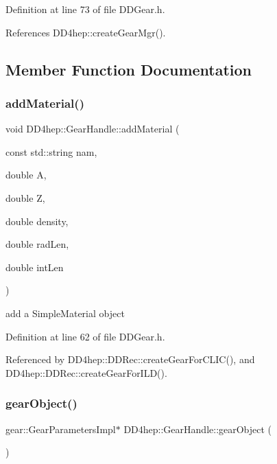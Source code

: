 Definition at line 73 of file D\+D\+Gear.\+h.



References D\+D4hep\+::create\+Gear\+Mgr().



\subsection{Member Function Documentation}
\hypertarget{class_d_d4hep_1_1_gear_handle_ae5f3ea169e473f5f0bd46f8d27d5d170}{}\label{class_d_d4hep_1_1_gear_handle_ae5f3ea169e473f5f0bd46f8d27d5d170} 
\subsubsection{\texorpdfstring{add\+Material()}{addMaterial()}}
{\footnotesize\ttfamily void D\+D4hep\+::\+Gear\+Handle\+::add\+Material (\begin{DoxyParamCaption}\item[{const std\+::string}]{nam,  }\item[{double}]{A,  }\item[{double}]{Z,  }\item[{double}]{density,  }\item[{double}]{rad\+Len,  }\item[{double}]{int\+Len }\end{DoxyParamCaption})\hspace{0.3cm}{\ttfamily [inline]}}



add a Simple\+Material object 



Definition at line 62 of file D\+D\+Gear.\+h.



Referenced by D\+D4hep\+::\+D\+D\+Rec\+::create\+Gear\+For\+C\+L\+I\+C(), and D\+D4hep\+::\+D\+D\+Rec\+::create\+Gear\+For\+I\+L\+D().

\hypertarget{class_d_d4hep_1_1_gear_handle_aaa9e8fbe619ab3a1a45fac04773e6c9a}{}\label{class_d_d4hep_1_1_gear_handle_aaa9e8fbe619ab3a1a45fac04773e6c9a} 
\subsubsection{\texorpdfstring{gear\+Object()}{gearObject()}}
{\footnotesize\ttfamily gear\+::\+Gear\+Parameters\+Impl$\ast$ D\+D4hep\+::\+Gear\+Handle\+::gear\+Object (\begin{DoxyParamCaption}{ }\end{DoxyParamCaption})\hspace{0.3cm}{\ttfamily [inline]}}

